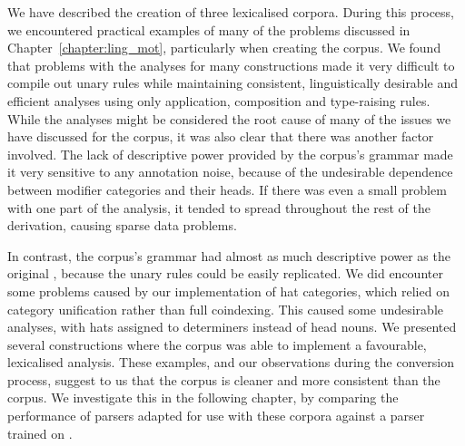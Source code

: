 We have described the creation of three lexicalised corpora. During this
process, we encountered practical examples of many of the problems discussed in
Chapter~\ref{chapter:ling_mot}, particularly when creating the \nounary corpus.
We found that problems with the \ccgbank analyses for many constructions made it
very difficult to compile out unary rules while maintaining consistent,
linguistically desirable and efficient analyses using only application,
composition and type-raising rules. While the \ccgbank analyses might be
considered the root cause of many of the issues we have discussed for the
\nounary corpus, it was also clear that there was another factor involved. The
lack of descriptive power provided by the \nounary corpus's grammar made it very
sensitive to any annotation noise, because of the undesirable dependence between
modifier categories and their heads. If there was even a small problem with one
part of the analysis, it tended to spread throughout the rest of the derivation,
causing sparse data problems.

In contrast, the \hatsys corpus's grammar had almost as much descriptive power
as the original \ccgbank, because the unary rules could be easily replicated. We
did encounter some problems caused by our implementation of hat categories,
which relied on category unification rather than full coindexing. This caused
some undesirable analyses, with hats assigned to determiners instead of head
nouns. We presented several constructions where the \hatsys corpus was able to
implement a favourable, lexicalised analysis. These examples, and our
observations during the conversion process, suggest to us that the \hatsys
corpus is cleaner and more consistent than the \nounary corpus. We investigate
this in the following chapter, by comparing the performance of \candc parsers
adapted for use with these corpora against a parser trained on \ccgbank.
